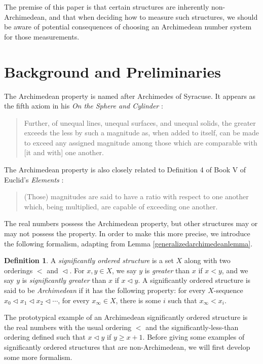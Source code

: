 \documentclass[reqno]{article}
\theoremstyle{definition}
\newtheorem{definition}{Definition}
\begin{document}
The premise of this paper is that certain structures are inherently
non-Archimedean, and that when deciding how to measure such structures,
we should be aware of potential consequences of choosing an
Archimedean number system for those measurements.


\section{Background and Preliminaries}

The Archimedean property is named after Archimedes of Syracuse.
It appears as the fifth axiom in his \emph{On the Sphere
and Cylinder} \cite{archimedes}:
\begin{quote}
    Further, of unequal lines, unequal surfaces, and unequal
    solids, the greater exceeds the less by such a magnitude
    as, when added to itself, can be made to exceed any
    assigned magnitude among those which are comparable with
    [it and with] one another.
\end{quote}
The Archimedean property is also closely related to Definition 4 of Book V of Euclid's
\emph{Elements} \cite{euclid}:
\begin{quote}
    (Those) magnitudes are said to have a ratio
    with respect to one another which, being
    multiplied, are capable of exceeding one
    another.
\end{quote}

The real numbers possess the Archimedean property, but other structures
may or may not possess the property. In order to make this more precise,
we introduce the following formalism, adapting from Lemma \ref{generalizedarchimedeanlemma}.

\begin{definition}
    A \emph{significantly ordered structure} is a set $X$ along with
    two orderings $<$ and $\vartriangleleft$.
    For $x,y\in X$, we say $y$ is \emph{greater} than $x$ if $x<y$, and
    we say $y$ is \emph{significantly greater} than $x$ if $x\vartriangleleft y$.
    A significantly ordered structure is said to be \emph{Archimedean} if it
    has the following property: for every $X$-sequence
    $x_0\vartriangleleft x_1\vartriangleleft x_2 \vartriangleleft \cdots$,
    for every $x_\infty\in X$, there is some $i$ such that $x_\infty<x_i$.
\end{definition}

The prototypical example of an Archimedean significantly ordered structure is the real
numbers with the usual ordering $<$ and the significantly-less-than
ordering defined such that $x\vartriangleleft y$ if $y\geq x+1$.
Before giving some examples of significantly ordered structures that are non-Archimedean,
we will first develop some more formalism.
\end{document}
